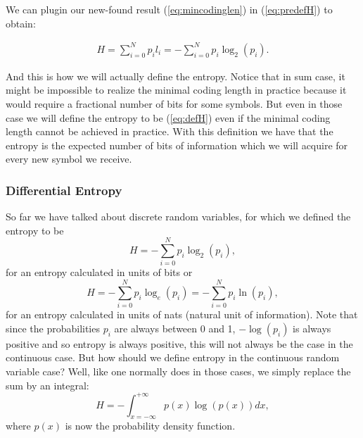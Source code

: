 \documentclass[]{article}
\begin{document}
We can plugin our new-found result (\ref{eq:mincodinglen}) in (\ref{eq:predefH}) to obtain:

\begin{multline}
\label{eq:defH}
H = \sum_{i=0}^N p_i l_i = -\sum_{i=0}^N p_i \log_2(p_i) .
\end{multline}

And this is how we will actually define the entropy. Notice that in sum case, it might be impossible to realize the minimal coding length in practice because it would require a fractional number of bits for some symbols. But even in those case we will define the entropy to be (\ref{eq:defH}) even if the minimal coding length cannot be achieved in practice. With this definition we have that the entropy is the expected number of bits of information which we will acquire for every new symbol we receive. 

\subsubsection{Differential Entropy}
\label{differential-entropy}

So far we have talked about discrete random variables, for which we defined the entropy to be
\begin{equation}
\label{eq:defH2}
H =  -\sum_{i=0}^N p_i \log_2(p_i) ,
\end{equation}
for an entropy calculated in units of bits or 
\begin{equation}
\label{eq:defHnat}
H =  -\sum_{i=0}^N p_i \log_e(p_i) = -\sum_{i=0}^N p_i \ln(p_i) ,
\end{equation}
for an entropy calculated in units of nats (natural unit of information). Note that since the probabilities $p_i$ are always between 0 and 1, $-\log(p_i)$ is always positive and so entropy is always positive, this will not always be the case in the continuous case. But how should we define entropy in the continuous random variable case? Well, like one normally does in those cases, we simply replace the sum by an integral:
\begin{equation}
\label{eq:defHcont}
H =  -\int_{x=-\infty}^{+\infty} p(x) \log(p(x)) dx ,
\end{equation}
where $p(x)$ is now the probability density function. 
\end{document}
